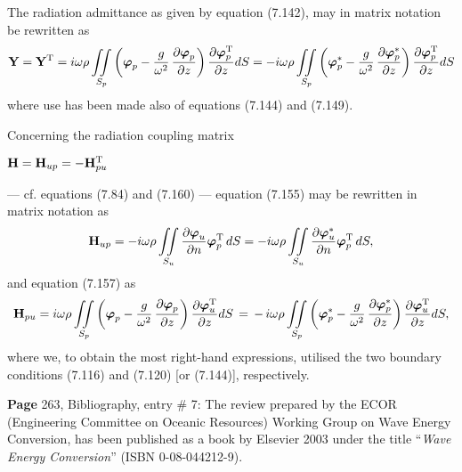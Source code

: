 \documentclass[a4paper,12pt]{article}
\newcommand{\bvf}{\mbox{\boldmath $\varphi$}} %
\newcommand{\tr}{^{\rm T}} %
\begin{document}
The radiation admittance as given by equation (7.142), may in matrix notation be rewritten as
\begin{equation}
{\bf Y} = {\bf Y}\tr = 
         i\omega\rho \mathop{\int\!\!\!\int}_{S_p} \left( \bvf_{p} - \frac{g}{\omega^2}\, \frac{\partial \bvf_{p} }{\partial z}\right) \frac{\partial \bvf_{p}\tr }{\partial z} dS         = 
         - i\omega\rho \mathop{\int\!\!\!\int}_{S_p} \left( \bvf_{p}^* - \frac{g}{\omega^2}\, \frac{\partial \bvf_{p}^* }{\partial z}\right) \frac{\partial \bvf_{p}\tr }{\partial z}  dS         
\nonumber 
\end{equation} 
where use has been made also of equations (7.144) and (7.149).

Concerning the radiation coupling matrix \\
\centerline{${\bf H} = {\bf H}_{up} = - {\bf H}_{pu}\tr$}
--- cf. equations (7.84) and (7.160) --- equation (7.155) may be rewritten in matrix notation as \\
\begin{equation}
{\bf H}_{up} = -i\omega\rho \mathop{\int\!\!\!\int}_{S_u}
	\frac{\partial \bvf_{u}}{\partial n}\bvf_{p}\tr\, dS
       = -i\omega\rho \mathop{\int\!\!\!\int}_{S_u}
	\frac{\partial \bvf_{u}^*}{\partial n}\bvf_{p}\tr\, dS
\nonumber ,
\end{equation}
and equation (7.157) as \\
\begin{equation}
{\bf H}_{pu}  = i\omega\rho
         \mathop{\int\!\!\!\int}_{S_p} \left( \bvf_{p} - \frac{g}{\omega^2}\, \frac{\partial \bvf_{p} }{\partial z}\right) \frac{\partial \bvf_{u}\tr }{\partial z} dS  \, = \,
         - \, i\omega\rho
         \mathop{\int\!\!\!\int}_{S_p} \left( \bvf_{p}^* - \frac{g}{\omega^2}\, \frac{\partial \bvf_{p}^* }{\partial z}\right) \frac{\partial \bvf_{u}\tr }{\partial z} dS ,             
\nonumber 
\end{equation} 
where we, to obtain the most right-hand expressions, utilised the two boundary conditions (7.116) and (7.120) [or (7.144)], respectively. 

%
\vspace{0.1cm} %

\vspace{0.3cm}  %

\noindent %
{\bf Page} 263, Bibliography, entry \# 7: \newline \noindent
The review prepared by the ECOR (Engineering Committee on Oceanic Resources) Working Group on Wave Energy Conversion, has been published as a book by Elsevier 2003 under the title ``{\em Wave Energy Conversion}'' (ISBN 0-08-044212-9). %
\vspace{-0.2cm}
\vspace{1cm}
\noindent
\end{document}
